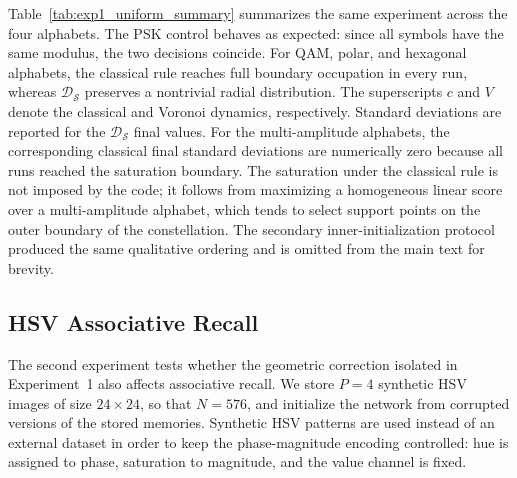 \documentclass[10pt,journal,letterpaper]{IEEEtran}
\begin{document}
Table~\ref{tab:exp1_uniform_summary} summarizes the same experiment across the
four alphabets. The PSK control behaves as expected: since all symbols have the
same modulus, the two decisions coincide. For QAM, polar, and hexagonal
alphabets, the classical rule reaches full boundary occupation in every run,
whereas $\mathcal{D}_{\mathcal{S}}$ preserves a nontrivial radial distribution.
The superscripts $c$ and $V$ denote the classical and Voronoi dynamics,
respectively. Standard deviations are reported for the
$\mathcal{D}_{\mathcal{S}}$ final values. For the multi-amplitude alphabets, the
corresponding classical final standard deviations are numerically zero because
all runs reached the saturation boundary.
The saturation under the classical rule is not imposed by the code; it follows
from maximizing a homogeneous linear score over a multi-amplitude alphabet,
which tends to select support points on the outer boundary of the constellation.
The secondary inner-initialization protocol produced the same qualitative
ordering and is omitted from the main text for brevity.

\begin{table}[!htbp]
\centering
\caption{Experiment~1 under uniform initialization. Values are Monte Carlo means over $100$ runs.}
\label{tab:exp1_uniform_summary}
\scriptsize
\setlength{\tabcolsep}{2.1pt}
\resizebox{\columnwidth}{!}{%

}
\end{table}

\subsection{HSV Associative Recall}
\label{sec:exp_hsv_retrieval}

The second experiment tests whether the geometric correction isolated in
Experiment~1 also affects associative recall. We store $P=4$ synthetic HSV
images of size $24\times24$, so that $N=576$, and initialize the network from
corrupted versions of the stored memories. Synthetic HSV patterns are used
instead of an external dataset in order to keep the phase-magnitude encoding
controlled: hue is assigned to phase, saturation to magnitude, and the value
channel is fixed.
\end{document}
